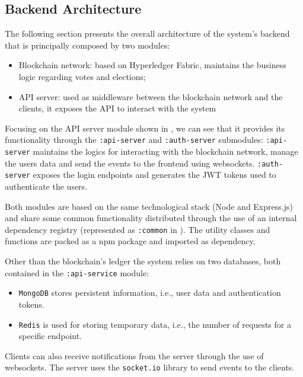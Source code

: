 \documentclass{scrartcl}
\begin{document}
\subsection{Backend Architecture}
The following section presents the overall architecture of the system's backend that is principally composed  by two modules:
\begin{itemize}
    \item Blockchain network: based on Hyperledger Fabric, maintains the business logic regarding votes and elections;
    \item API server: used as middleware between the blockchain network and the clients, it exposes the API to interact with the system
\end{itemize}

Focusing on the API server module shown in , we can see that it provides its functionality through the \texttt{:api-server} and \texttt{:auth-server} submodules: \texttt{:api-server} maintains the logics for interacting with the blockchain network, manage the users data and send the events to the frontend using websockets. \texttt{:auth-server} exposes the login endpoints and generates the JWT tokens used to authenticate the users.

Both modules are based on the same technological stack (Node and Express.js) and share some common functionality distributed through the use of an internal dependency registry (represented as \texttt{:common} in ). The utility classes and functions are packed as a npm package and imported as dependency.

Other than the blockchain's ledger the system relies on two databases, both contained in the \texttt{:api-service} module:
\begin{itemize}
    \item \texttt{MongoDB} stores persistent information, i.e., user data and authentication tokens.
    \item \texttt{Redis} is used for storing temporary data, i.e., the number of requests for a specific endpoint.
\end{itemize}

Clients can also receive notifications from the server through the use of websockets. The server uses the \texttt{socket.io} library to send events to the clients.
\end{document}
